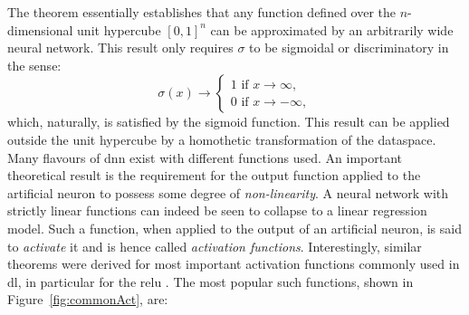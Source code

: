 The theorem essentially establishes that any function defined over the $n$-dimensional unit hypercube $[0, 1]^n$ can be approximated by an arbitrarily wide neural network. This result only requires $\sigma$ to be sigmoidal or discriminatory in the sense:
\begin{equation}
    \sigma(x) \rightarrow
    \begin{cases}
        1 \text{ if } x \rightarrow \infty,  \\
        0 \text{ if } x \rightarrow -\infty,
    \end{cases}
\end{equation}
which, naturally, is satisfied by the sigmoid function. This result can be applied outside the unit hypercube by a homothetic transformation of the dataspace. Many flavours of \gls{dnn} exist with different functions used. An important theoretical result is the requirement for the output function applied to the artificial neuron to possess some degree of \textit{non-linearity}. A neural network with strictly linear functions can indeed be seen to collapse to a linear regression model. Such a function, when applied to the output of an artificial neuron, is said to \textit{activate} it and is hence called \textit{activation functions}. Interestingly, similar theorems were derived for most important activation functions commonly used in \gls{dl}, in particular for the \gls{relu} \cite{universApproximator-Relu}. The most popular such functions, shown in Figure~\ref{fig:commonAct}, are:
